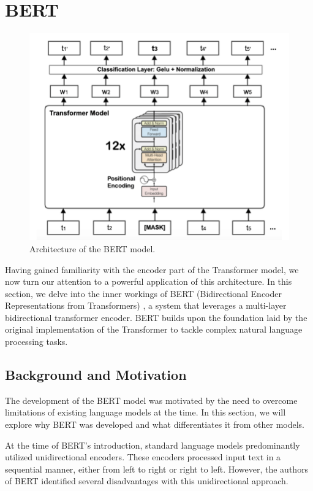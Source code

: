 \documentclass[12pt,oneside,bibtotoc,liststotoc]{scrbook}
\begin{document}
\section{BERT}
\begin{figure} %
  \centering
  \includegraphics[width=12cm]{img/bert_architecture.png}
  \caption{Architecture of the BERT model. \cite{bertArchi}}
  \label{fig:bert_architecture}
\end{figure}
Having gained familiarity with the encoder part of the Transformer model, we now turn our attention to a powerful application of this architecture. In this section, we delve into the inner workings of BERT (Bidirectional Encoder Representations from Transformers) \cite{bert}, a system that leverages a multi-layer bidirectional transformer encoder. BERT builds upon the foundation laid by the original implementation of the Transformer to tackle complex natural language processing tasks.

\subsection{Background and Motivation}
The development of the BERT model was motivated by the need to overcome limitations of existing language models at the time. In this section, we will explore why BERT was developed and what differentiates it from other models.

At the time of BERT's introduction, standard language models predominantly utilized unidirectional encoders. These encoders processed input text in a sequential manner, either from left to right or right to left. However, the authors of BERT identified several disadvantages with this unidirectional approach.
\end{document}
